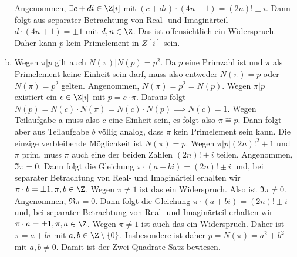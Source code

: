 \documentclass{article}
\begin{document}
\begin{enumerate}[(a)]
        Angenommen, $\exists c + di \in \Z[i]$ mit $(c + di) \cdot (4n +1) = (2n)! \pm i$. Dann folgt aus separater Betrachtung von Real- und Imaginärteil $d \cdot (4n + 1) = \pm 1$ mit $d, n\in \Z$. Das ist offensichtlich ein Widerspruch. Daher kann $p$ kein Primelement in $Z[i]$ sein.
        \item Wegen $\pi | p$ gilt auch $N(\pi) | N(p) = p^2$. 
        Da $p$ eine Primzahl ist und $\pi$ als Primelement keine Einheit sein darf, muss also entweder $N(\pi) = p$ oder $N(\pi) = p^2$ gelten. 
        Angenommen, $N(\pi) = p^2 = N(p)$. 
        Wegen $\pi | p$ existiert ein $c \in \Z[i]$ mit $p = c \cdot \pi$. 
        Daraus folgt $N(p) = N(c) \cdot N(\pi) = N(c) \cdot N(p) \implies N(c) = 1$. 
        Wegen Teilaufgabe a muss also $c$ eine Einheit sein, es folgt also $\pi \hat{=} p$. 
        Dann folgt aber aus Teilaufgabe $b$ völlig analog, dass $\pi$ kein Primelement sein kann. 
        Die einzige verbleibende Möglichkeit ist $N(\pi) = p$. Wegen $\pi | p | (2n)!^2 + 1$ und $\pi$ prim, muss $\pi$ auch eine der beiden Zahlen $(2n)! \pm i$ teilen. Angenommen, $\Im \pi = 0$. Dann folgt die Gleichung $\pi \cdot ( a + bi) = (2n)! \pm i$ und, bei separater Betrachtung von Real- und Imaginärteil erhalten wir $\pi \cdot b = \pm 1, \pi, b \in \Z$. Wegen $\pi \neq 1$ ist das ein Widerspruch. Also ist $\Im \pi \neq 0$. Angenommen, $\Re \pi = 0$. Dann folgt die Gleichung $\pi \cdot (a + bi) = (2n)! \pm i$ und, bei separater Betrachtung von Real- und Imaginärteil erhalten wir $\pi \cdot a = \pm 1, \pi, a \in \Z$. Wegen $\pi \neq 1$ ist auch das ein Widerspruch. Daher ist $\pi = a + bi$ mit $a, b \in \Z\setminus\{0\}$. Insbesondere ist daher $p = N(\pi) = a^2 + b^2$ mit $a, b \neq 0$. Damit ist der Zwei-Quadrate-Satz bewiesen.
    \end{enumerate}
\end{document}
